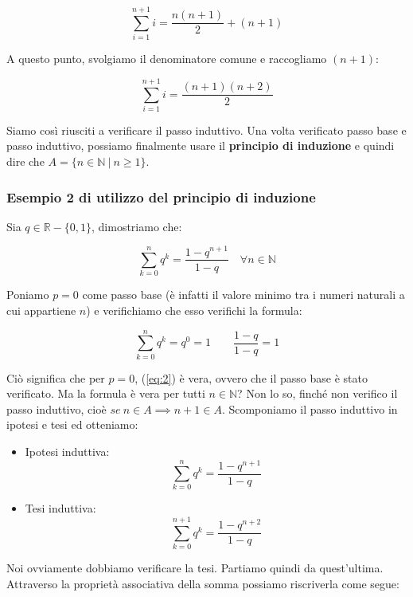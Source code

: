 \documentclass{article}
\begin{document}
\begin{equation*}
    \sum_{i = 1}^{n+1} i = \frac{n(n+1)}{2} + (n+1)
\end{equation*}

\noindent A questo punto, svolgiamo il denominatore comune e raccogliamo $(n+1)$:

\begin{equation*}
    \sum_{i = 1}^{n+1} i = \frac{(n+1)(n+2)}{2}
\end{equation*}

\noindent Siamo così riusciti a verificare il passo induttivo. Una volta verificato passo base e passo induttivo, possiamo finalmente usare il \textbf{principio di induzione} e quindi dire che $A = \{ n \in \mathbb{N} \ | \ n \geq 1 \}$.

\subsubsection{Esempio 2 di utilizzo del principio di induzione}
Sia $q \in \mathbb{R} - \{ 0, 1 \}$, dimostriamo che: 

\begin{equation}
    \sum_{k = 0}^n q^k = \frac{1-q^{n+1}}{1-q} \quad \forall n \in \mathbb{N}
    \label{eq:2}
\end{equation}

\noindent Poniamo $p = 0$ come passo base (è infatti il valore minimo tra i numeri naturali a cui appartiene $n$) e verifichiamo che esso verifichi la formula: 

\begin{equation*}
    \sum_{k = 0}^n q^k = q^0 = 1 \qquad \frac{1 - q}{1 - q} = 1
\end{equation*}

\noindent Ciò significa che per $p = 0$, (\ref{eq:2}) è vera, ovvero che il passo base è stato verificato. Ma la formula è vera per tutti $n \in \mathbb{N}$? Non lo so, finché non verifico il passo induttivo, cioè $se \ n \in A \implies n+1 \in A$. Scomponiamo il passo induttivo in ipotesi e tesi ed otteniamo: 

\begin{itemize}
    \item Ipotesi induttiva: $$\sum_{k = 0}^n q^k = \frac{1-q^{n+1}}{1-q}$$
    \item Tesi induttiva: $$\sum_{k = 0}^{n + 1} q^k = \frac{1-q^{n+2}}{1-q}$$
\end{itemize}

\noindent Noi ovviamente dobbiamo verificare la tesi. Partiamo quindi da quest'ultima. Attraverso la proprietà associativa della somma possiamo riscriverla come segue:
\end{document}
